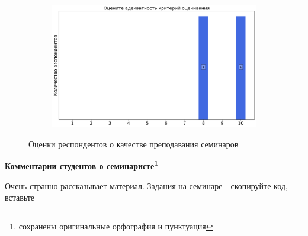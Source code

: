 \begin{figure}[H]
\begin{subfigure}[b]{0.45\textwidth}
			\end{subfigure}
			\begin{subfigure}[b]{0.45\textwidth}
				\centering
				\includegraphics[width=\textwidth]{images/2 course/Компьютерные технологии/seminarists-marks-Гутник С.А.-3.png}
			\end{subfigure}	
			\caption{Оценки респондентов о качестве преподавания семинаров}
		\end{figure}

		\textbf{Комментарии студентов о семинаристе\protect\footnote{сохранены оригинальные орфография и пунктуация}}
            \begin{commentbox} 
                Очень странно рассказывает материал. Задания на семинаре - скопируйте код, вставьте 
            \end{commentbox}
            

